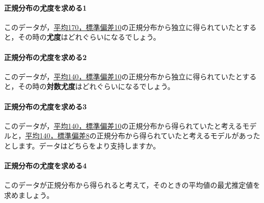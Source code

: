 \documentclass{ltjsarticle}
\begin{document}
\paragraph{正規分布の尤度を求める1}このデータが，\underline{平均170，標準偏差10}の正規分布から独立に得られていたとすると，その時の\textbf{尤度}はどれぐらいになるでしょう。
\paragraph{正規分布の尤度を求める2}このデータが，\underline{平均140，標準偏差10}の正規分布から独立に得られていたとすると，その時の\textbf{対数尤度}はどれぐらいになるでしょう。
\paragraph{正規分布の尤度を求める3}このデータが，\underline{平均140，標準偏差10}の正規分布から得られていたと考えるモデルと，\underline{平均140，標準偏差8}の正規分布から得られていたと考えるモデルがあったとします。データはどちらをより支持しますか。
\paragraph{正規分布の尤度を求める4}このデータが正規分布から得られると考えて，そのときの平均値の最尤推定値を求めましょう。
\end{document}
